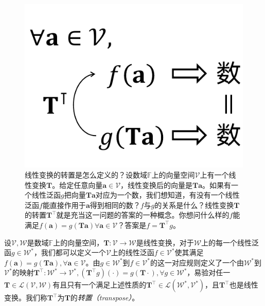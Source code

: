 \documentclass[main.tex]{subfiles}
\begin{document}
\begin{figure}[htbp]
    \centering
    \includegraphics{images/transpose.pdf}
    \caption{线性变换的转置是怎么定义的？设数域$\mathbb{F}$上的向量空间$\mathcal{V}$上有一个线性变换$\mathbf{T}$。给定任意向量$\mathbf{a}\in\mathcal{V}$，线性变换后的向量是$\mathbf{Ta}$。如果有一个线性泛函$g$把向量$\mathbf{Ta}$对应为一个数，我们想知道，有没有一个线性泛函$f$能直接作用于$\mathbf{a}$得到相同的数？$f$与$g$的关系是什么？线性变换$\mathbf{T}$的转置$\mathbf{T}^\intercal$就是充当这一问题的答案的一种概念。你想问什么样的$f$能满足$f\left(\mathbf{a}\right)=g\left(\mathbf{Ta}\right)\forall\mathbf{a}\in\mathcal{V}$？答案是$f=\mathbf{T}^\intercal g$。}
    \label{fig:II.2.2}
\end{figure}

\begin{definition}[线性变换的转置]\label{def:II.2.16}
    设$\mathcal{V},\mathcal{W}$是数域$\mathbb{F}$上的向量空间，$\mathbf{T}:\mathcal{V}\rightarrow\mathcal{W}$是线性变换，对于$\mathcal{W}$上的每一个线性泛函$g\in\mathcal{W}^*$，我们都可以定义一个$\mathcal{V}$上的线性泛函$f\in\mathcal{V}^*$使其满足$f\left(\mathbf{a}\right)=g\left(\mathbf{Ta}\right),\forall \mathbf{a}\in\mathcal{V}$。由$g\in\mathcal{W}^*$到$f\in\mathcal{V}^*$的这一对应规则定义了一个由$\mathcal{W}^*$到$\mathcal{V}^*$的映射$\mathbf{T}^\intercal:\mathcal{W}^*\rightarrow\mathcal{V}^*,\left(\mathbf{T}^\intercal g\right)\left(\cdot\right)=g\left(\mathbf{T}\cdot\right),\forall g\in\mathcal{W}^*$，易验对任一$\mathbf{T}\in\mathcal{L}\left(\mathcal{V},\mathcal{W}\right)$有且只有一个满足上述性质的$\mathbf{T}^\intercal\in\mathcal{L}\left(\mathcal{W}^*,\mathcal{V}^*\right)$，且$\mathbf{T}^\intercal$也是线性变换。我们称$\mathbf{T}^\intercal$为$\mathbf{T}$的\emph{转置（transpose）}。
\end{definition}
\end{document}
